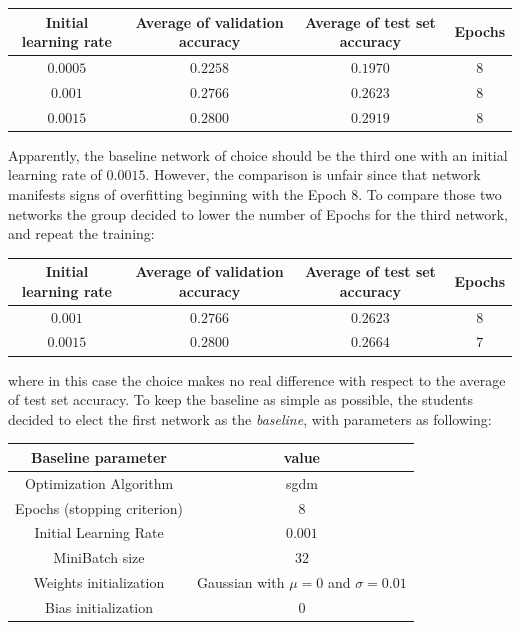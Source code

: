 \documentclass[a4paper, 11pt]{article} %
\begin{document}
\bigskip

\begin{center}
\begin{tabular}{|c|c|c|c|}
\hline 
Initial learning rate & Average of validation accuracy & Average of test set accuracy & Epochs \\
\hline \hline 
$0.0005$ & $0.2258$ & $0.1970$ & $8$ \\
\hline
$0.001$ & $0.2766$ & $0.2623$ & $8$ \\
\hline 
$0.0015$ & $0.2800$ & $0.2919$ & $8$ \\
\hline
\end{tabular}
\end{center}
\bigskip

Apparently, the baseline network of choice should be the third one with an initial learning rate of $0.0015$. However, the comparison is unfair since that network manifests signs of overfitting beginning with the Epoch $8$. To compare those two networks the group decided to lower the number of Epochs for the third network, and repeat the training:

\bigskip
\begin{center}
\begin{tabular}{|c|c|c|c|}
\hline 
Initial learning rate & Average of validation accuracy & Average of test set accuracy & Epochs \\
\hline \hline 
$0.001$ & $0.2766$ & $0.2623$ & $8$\\
\hline 
$0.0015$ & $0.2800$ & $0.2664$ & $7$\\
\hline
\end{tabular}
\end{center}
\bigskip

where in this case the choice makes no real difference with respect to the average of test set accuracy. To keep the baseline as simple as possible, the students decided to elect the first network as the \emph{baseline}, with parameters as following:

\bigskip
\begin{center}
\begin{tabular}{|c|c|}
\hline 
Baseline parameter & value \\
\hline \hline 
Optimization Algorithm & sgdm \\
\hline 
Epochs (stopping criterion) & $8$\\
\hline 
Initial Learning Rate & $0.001$\\
\hline
MiniBatch size & $32$ \\
\hline
Weights initialization & Gaussian with $\mu = 0$ and $\sigma = 0.01$\\
\hline 
Bias initialization & $0$\\
\hline
\end{tabular}
\end{center}
\bigskip
\end{document}

